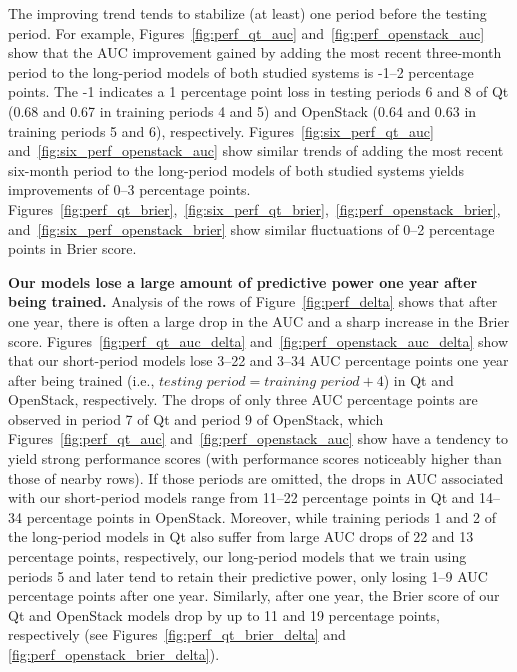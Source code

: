 The improving trend tends to stabilize (at least) one period before the testing period.
For example, Figures~\ref{fig:perf_qt_auc} and~\ref{fig:perf_openstack_auc} show that the AUC improvement gained by adding the most recent three-month period to the long-period models of both studied systems is -1--2 percentage points.
The -1 indicates a 1 percentage point loss in testing periods 6 and 8 of {\sc Qt} (0.68 and 0.67 in training periods 4 and 5) and {\sc OpenStack} (0.64 and 0.63 in training periods 5 and 6), respectively.
Figures~\ref{fig:six_perf_qt_auc} and~\ref{fig:six_perf_openstack_auc} show similar trends of adding the most recent six-month period to the long-period models of both studied systems yields improvements of 0--3 percentage points.
Figures~\ref{fig:perf_qt_brier},~\ref{fig:six_perf_qt_brier},~\ref{fig:perf_openstack_brier}, and~\ref{fig:six_perf_openstack_brier} show similar fluctuations of 0--2 percentage points in Brier score.

\textbf{Our models lose a large amount of predictive power one year after being trained.}
Analysis of the rows of Figure~\ref{fig:perf_delta} shows that after one year, there is often a large drop in the AUC and a sharp increase in the Brier score.
Figures~\ref{fig:perf_qt_auc_delta} and~\ref{fig:perf_openstack_auc_delta} show that our short-period models lose 3--22 and 3--34 AUC percentage points one year after being trained (i.e., $\textit{testing period} = \textit{training period} + 4$) in {\sc Qt} and {\sc OpenStack}, respectively.
The drops of only three AUC percentage points are observed in period 7 of {\sc Qt} and period 9 of {\sc OpenStack}, which Figures~\ref{fig:perf_qt_auc} and~\ref{fig:perf_openstack_auc} show have a tendency to yield strong performance scores (with performance scores noticeably higher than those of nearby rows).
If those periods are omitted, the drops in AUC associated with our short-period models range from 11--22 percentage points in {\sc Qt} and 14--34 percentage points in {\sc OpenStack}.
Moreover, while training periods 1 and 2 of the long-period models in {\sc Qt} also suffer from large AUC drops of 22 and 13 percentage points, respectively, our long-period models that we train using periods 5 and later tend to retain their predictive power, only losing 1--9 AUC percentage points after one year.
Similarly, after one year, the Brier score of our {\sc Qt} and {\sc OpenStack} models drop by up to 11 and 19 percentage points, respectively (see Figures~\ref{fig:perf_qt_brier_delta} and \ref{fig:perf_openstack_brier_delta}).


